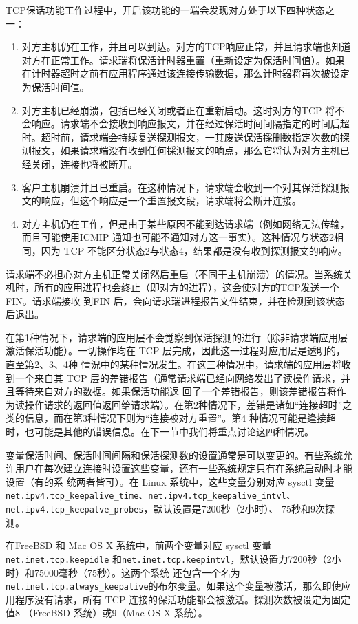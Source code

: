 TCP保话功能工作过程中，开启该功能的一端会发现对方处于以下四种状态之一：
\begin{enumerate}
    \item 对方主机仍在工作，并且可以到达。对方的TCP响应正常，并且请求端也知道对方在正常工作。请求瑞将保活计时器重置（重新设定为保活时间值）。如果在计时器超时之前有应用程序通过该连接传输数据，那么计时器将再次被设定为保活时间值。
    \item 对方主机已经崩溃，包括已经关闭或者正在重新启动。这时对方的TCP 将不会响应。请求端不会接收到响应报文，并在经过保活时间间隔指定的时间后超时。超时前，请求端会持续复送探测报文，一其废送保活採删数指定次数的探测报文，如果请求端没有收到任何採测报文的响点，那么它将认为对方主机已经关闭，连接也将被断开。
    \item 客户主机崩溃并且已重启。在这种情况下，请求端会收到一个对其保活探测报文的响应，但这个响应是一个重置报文段，请求端将会断开连接。
    \item 对方主机仍在工作，但是由于某些原因不能到达请求端（例如网络无法传输，而且可能使用ICMIP 通知也可能不通知对方这一事实）。这种情况与状态2相同，因为 TCP 不能区分状态2与状态4，结果都是没有收到探测报文的响应。
\end{enumerate}

请求端不必担心对方主机正常关闭然后重启（不同于主机崩溃）的情况。当系统关机时，所有的应用进程也会终止（即对方的进程），这会使对方的TCP发送一个FIN。请求端接收
到FIN 后，会向请求瑞进程报告文件结束，并在检测到该状态后退出。

在第1种情况下，请求端的应用层不会觉察到保活探测的进行（除非请求端应用层激活保活功能）。一切操作均在 TCP 层完成，因此这一过程对应用层是透明的，直至第2、3、4种
情況中的某种情况发生。在这三种情况中，请求端的应用层将收到一个来自其 TCP 层的差错报告（通常请求端已经向网络发出了读操作请求，并且等待来自对方的数据。如果保活功能返
回了一个差错报告，则该差错报告将作为读操作请求的返回值返回给请求端）。在第2种情况下，差错是诸如“连接超时”之类的信息，而在第3种情况下则为“连接被对方重置”。第4
种情况可能是逢接超时，也可能是其他的错误信息。在下一节中我们将重点讨论这四种情况。

变量保活时间、保活时间间隔和保活探测数的设置通常是可以变更的。有些系统允许用户在每次建立连接时设置这些变量，还有一些系统规定只有在系统启动时才能设置（有的系
统两者皆可）。在 Linux 系统中，这些变量分别对应 sysctl 变量 \verb|net.ipv4.tcp_keepalive_time|、\verb|net.ipv4.tcp_keepalive_intvl|、\verb|net.ipv4.tcp_keepalve_probes|，默认设置是7200秒（2小时）、
75秒和9次探测。

在FreeBSD 和 Mac OS X 系统中，前两个变量对应 sysctl 变量 \verb|net.inet.tcp.keepidle| 和\verb|net.inet.tcp.keepintvl|，默认设置力7200秒（2小时）和75000毫秒（75秒）。这两个系统
还包含一个名为\verb|net.inet.tcp.always_keepalive|的布尔变量。如果这个变量被激活，那么即使应用程序没有请求，所有 TCP 连接的保活功能都会被激活。探测次数被设定为固定值8
（FreeBSD 系统）或9（Mac OS X 系统）。

